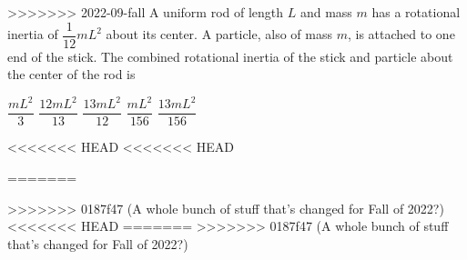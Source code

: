 \documentclass{../../oss-apphys-exam}
\begin{document}
\begin{multicols*}{2}
\begin{questions}
>>>>>>> 2022-09-fall
    \question A uniform rod of length $L$ and mass $m$ has a rotational inertia
    of $\dfrac1{12}mL^2$ about its center. A particle, also of mass $m$, is
    attached to one end of the stick. The combined rotational inertia of the
    stick and particle about the center of the rod is
    \begin{center}
    \end{center}
    \begin{choices}
      \choice$\dfrac{mL^2}3$
      \choice$\dfrac{12mL^2}{13}$
      \choice$\dfrac{13mL^2}{12}$
      \choice$\dfrac{mL^2}{156}$
      \choice$\dfrac{13mL^2}{156}$
    \end{choices}
<<<<<<< HEAD
<<<<<<< HEAD

=======
    \columnbreak
    
>>>>>>> 0187f47 (A whole bunch of stuff that's changed for Fall of 2022?)
<<<<<<< HEAD
    \columnbreak
=======
>>>>>>> 0187f47 (A whole bunch of stuff that's changed for Fall of 2022?)
    

\end{questions}
\end{multicols*}
\end{document}
